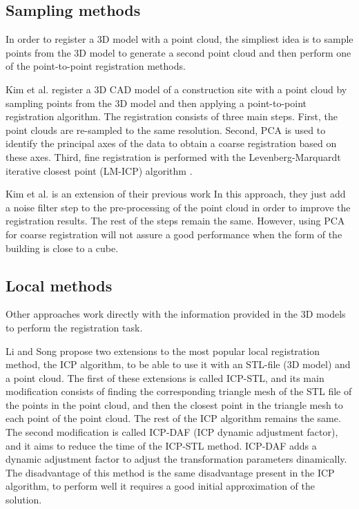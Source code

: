         \subsection{Sampling methods}

        In order to register a 3D model with a point cloud, the simpliest idea is to sample points from the 3D model to generate a second point cloud
        and then perform one of the point-to-point registration methods. 

        Kim et al. \cite{Kim_2011_fully} register a 3D CAD model of a construction site with a point cloud by sampling points from the 3D model 
        and then applying a point-to-point registration algorithm. The registration consists of three main steps. First, 
        the point clouds are re-sampled to the same resolution. Second, PCA is used to identify the principal axes of the data 
        to obtain a coarse registration based on these axes. Third, fine registration is performed with the Levenberg-Marquardt
        iterative closest point (LM-ICP) algorithm \cite{Fitzgibbon_2003_robust}. 
        
        Kim et al. \cite{Kim_2013_fully} is an extension of their previous work \cite{Kim_2011_fully}
        In this approach, they just add a noise filter step to the pre-processing of the point cloud in order to improve the registration results.
        The rest of the steps remain the same.
        However, using PCA for coarse registration will not assure a good performance when the form of the building is close to a cube.
        
        \subsection{Local methods}

        Other approaches work directly with the information provided in the 3D models to perform the registration task.

        Li and Song \cite{Li_2015_amodified} propose two extensions to the most popular local registration method, the ICP algorithm, 
        to be able to use it with an STL-file (3D model) and a point cloud.
        The first of these extensions is called ICP-STL, and its main modification consists of finding the corresponding triangle mesh of the STL file of the points 
        in the point cloud, and then the closest point in the triangle mesh to each point of the point cloud. The rest of the ICP algorithm remains the same.
        The second modification is called ICP-DAF (ICP dynamic adjustment factor), and it aims to reduce the time of the ICP-STL method. 
        ICP-DAF adds a dynamic adjustment factor to adjust the transformation parameters dinamically.
        The disadvantage of this method is the same disadvantage present in the ICP algorithm, to perform well it requires a good initial approximation of the solution.

